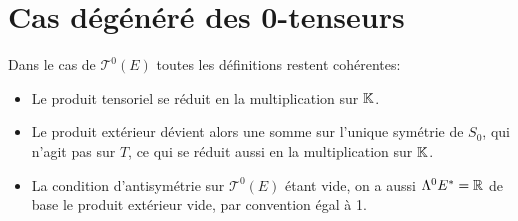    \section{Cas dégénéré des 0-tenseurs}
   Dans le cas de \(\mathscr{T}^0(E)\) toutes les définitions restent cohérentes:
   \begin{itemize}
      \item Le produit tensoriel se réduit en la multiplication sur \( \mathbb{K} \).
      \item Le produit extérieur dévient alors une somme sur l'unique symétrie de \( S_0 \), qui n'agit pas sur \( T \), ce qui se réduit aussi en la multiplication sur \( \mathbb{K} \).
      \item La condition d'antisymétrie sur \( \mathscr{T}^0(E) \) étant vide, on a aussi \(\Lambda^0 E^* = \mathbb{R}\) de base le produit extérieur vide, par convention égal à 1.
   \end{itemize}
